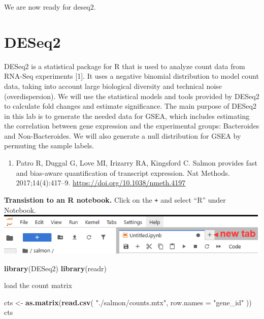 \documentclass[
]{book}
\newenvironment{Shaded}{\begin{snugshade}}{\end{snugshade}}
\newcommand{\AttributeTok}[1]{\textcolor[rgb]{0.13,0.29,0.53}{#1}}
\newcommand{\FunctionTok}[1]{\textcolor[rgb]{0.13,0.29,0.53}{\textbf{#1}}}
\newcommand{\NormalTok}[1]{#1}
\newcommand{\OtherTok}[1]{\textcolor[rgb]{0.56,0.35,0.01}{#1}}
\newcommand{\StringTok}[1]{\textcolor[rgb]{0.31,0.60,0.02}{#1}}
\providecommand{\tightlist}{%
  \setlength{\itemsep}{0pt}\setlength{\parskip}{0pt}}
\begin{document}
We are now ready for deseq2.

\section{DESeq2}\label{deseq2}

DESeq2 is a statistical package for R that is used to analyze count data from RNA-Seq experiments {[}1{]}.
It uses a negative binomial distribution to model count data, taking into account large biological diversity and technical noise
(overdispersion). We will use the statistical models and tools provided by DESeq2 to calculate fold changes and estimate significance.
The main purpose of DESeq2 in this lab is to generate the needed data for GSEA, which includes estimating the correlation between
gene expression and the experimental groups: Bacteroides and Non-Bacteroides. We will also generate a null distribution for
GSEA by permuting the sample labels.

\begin{enumerate}
\def\labelenumi{\arabic{enumi}.}
\tightlist
\item
  Patro R, Duggal G, Love MI, Irizarry RA, Kingsford C. Salmon provides fast and bias-aware quantification of transcript expression. Nat Methods. 2017;14(4):417--9. \url{https://doi.org/10.1038/nmeth.4197}
\end{enumerate}

\textbf{Transistion to an R notebook.} Click on the \texttt{+} and select ``R'' under Notebook.
\includegraphics{img/lab4/new_tab.png}

\begin{Shaded}
\begin{Highlighting}[numbers=left,,]
\FunctionTok{library}\NormalTok{(DESeq2)}
\FunctionTok{library}\NormalTok{(readr)}
\end{Highlighting}
\end{Shaded}

load the count matrix

\begin{Shaded}
\begin{Highlighting}[numbers=left,,]
\NormalTok{cts }\OtherTok{\textless{}{-}} \FunctionTok{as.matrix}\NormalTok{(}\FunctionTok{read.csv}\NormalTok{(}
    \StringTok{"./salmon/counts.mtx"}\NormalTok{,}
    \AttributeTok{row.names =} \StringTok{"gene\_id"}
\NormalTok{))}
\NormalTok{cts}
\end{Highlighting}
\end{Shaded}
\end{document}
